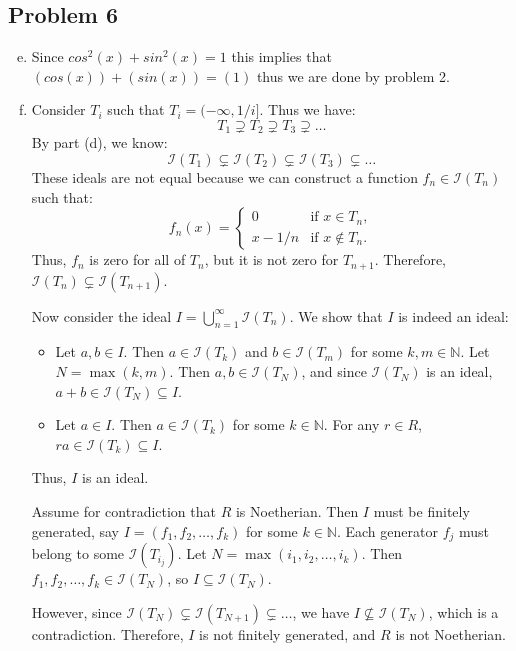 \documentclass[12pt, letterpaper]{article}
\theoremstyle{definition}
\begin{document}
\newpage
\subsection*{Problem 6}
\begin{enumerate}[(a)]
    \setcounter{enumi}{4}
    \item Since $cos^2(x)+sin^2(x)=1$ this implies that $(cos(x)) + (sin(x)) = (1)$ thus we are done by problem 2.
    \item Consider $T_i$ such that $T_i = (-\infty, 1/i]$. Thus we have:
    \[
    T_1 \supsetneq T_2 \supsetneq T_3 \supsetneq \dots
    \]
    By part (d), we know:
    \[
    \mathcal{I}(T_1) \subsetneq \mathcal{I}(T_2) \subsetneq \mathcal{I}(T_3) \subsetneq \dots
    \]
    These ideals are not equal because we can construct a function $f_n \in \mathcal{I}(T_n)$ such that:
    \[
    f_n(x) =
    \begin{cases}
    0 & \text{if } x \in T_n, \\
    x - 1/n & \text{if } x \notin T_n.
    \end{cases}
    \]
    Thus, $f_n$ is zero for all of $T_n$, but it is not zero for $T_{n+1}$. Therefore, $\mathcal{I}(T_n) \subsetneq \mathcal{I}(T_{n+1})$.
    
    Now consider the ideal $I = \bigcup_{n=1}^\infty \mathcal{I}(T_n)$. We show that $I$ is indeed an ideal:
    \begin{itemize}
        \item Let $a, b \in I$. Then $a \in \mathcal{I}(T_k)$ and $b \in \mathcal{I}(T_m)$ for some $k, m \in \mathbb{N}$. Let $N = \max(k, m)$. Then $a, b \in \mathcal{I}(T_N)$, and since $\mathcal{I}(T_N)$ is an ideal, $a + b \in \mathcal{I}(T_N) \subseteq I$.
        \item Let $a \in I$. Then $a \in \mathcal{I}(T_k)$ for some $k \in \mathbb{N}$. For any $r \in R$, $ra \in \mathcal{I}(T_k) \subseteq I$.
        
    \end{itemize}
    Thus, $I$ is an ideal.
    
    Assume for contradiction that $R$ is Noetherian. Then $I$ must be finitely generated, say $I = (f_1, f_2, \dots, f_k)$ for some $k \in \mathbb{N}$. Each generator $f_j$ must belong to some $\mathcal{I}(T_{i_j})$. Let $N = \max(i_1, i_2, \dots, i_k)$. Then $f_1, f_2, \dots, f_k \in \mathcal{I}(T_N)$, so $I \subseteq \mathcal{I}(T_N)$.
    
    However, since $\mathcal{I}(T_N) \subsetneq \mathcal{I}(T_{N+1}) \subsetneq \dots$, we have $I \not\subseteq \mathcal{I}(T_N)$, which is a contradiction. Therefore, $I$ is not finitely generated, and $R$ is not Noetherian.
\end{enumerate}
\end{document}
